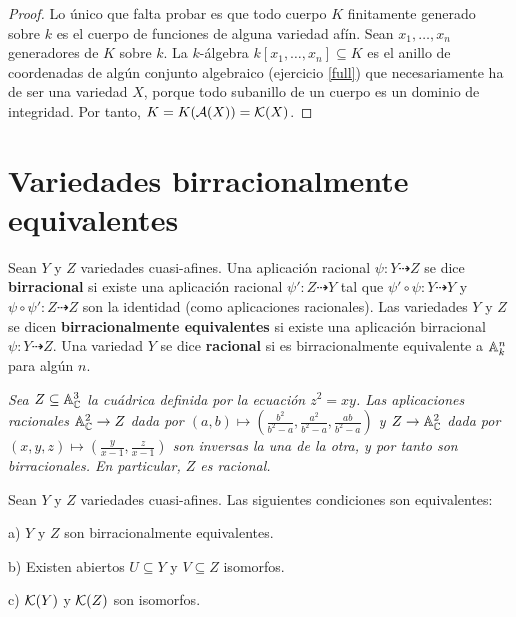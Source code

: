 \documentclass[ACGA.tex]{subfiles}
\begin{document}
\begin{proof}
 Lo único que falta probar es que todo cuerpo $K$ finitamente generado sobre $k$ es el cuerpo de funciones de alguna variedad afín. Sean $x_1,\ldots,x_n$ generadores de $K$ sobre $k$. La $k$-álgebra $k[x_1,\ldots,x_n]\subseteq K$ es el anillo de coordenadas de algún conjunto algebraico (ejercicio \ref{full}) que necesariamente ha de ser una variedad $X$, porque todo subanillo de un cuerpo es un dominio de integridad. Por tanto, $K=K(\mathcal{A}(X))={\mathcal K}(X)$.
\end{proof}


\section{Variedades birracionalmente equivalentes}


\begin{defi}
 Sean $Y$ y $Z$ variedades cuasi-afines. Una aplicación racional $\psi:Y\dashrightarrow Z$ se dice {\bf birracional} si existe una aplicación racional $\psi':Z\dashrightarrow Y$ tal que $\psi'\circ\psi:Y\dashrightarrow Y$ y $\psi\circ\psi':Z\dashrightarrow Z$ son la identidad (como aplicaciones racionales). Las variedades $Y$ y $Z$ se dicen {\bf birracionalmente equivalentes} si existe una aplicación birracional $\psi:Y\dashrightarrow Z$. Una variedad $Y$ se dice {\bf racional} si es birracionalmente equivalente a $\mathbb{A}^n_k$ para algún $n$.
\end{defi}

 \begin{ejs}\emph{
  Sea $Z\subseteq\mathbb{A}^3_{\mathbb{C}}$ la cuádrica definida por la ecuación $z^2=xy$. Las aplicaciones racionales $\mathbb{A}^2_{\mathbb{C}}\to Z$ dada por $(a,b)\mapsto(\frac{b^2}{b^2-a},\frac{a^2}{b^2-a},\frac{ab}{b^2-a})$ y $Z\to\mathbb{A}^2_{\mathbb{C}}$ dada por $(x,y,z)\mapsto (\frac{y}{x-1},\frac{z}{x-1})$ son inversas la una de la otra, y por tanto son birracionales. En particular, $Z$ es racional.}
 \end{ejs}

\begin{prop}\label{birracional}
 Sean $Y$ y $Z$ variedades cuasi-afines. Las siguientes condiciones son equivalentes:

a) $Y$ y $Z$ son birracionalmente equivalentes.

b) Existen abiertos $U\subseteq Y$ y $V\subseteq Z$ isomorfos.

c) ${\mathcal K}(Y)$ y ${\mathcal K}(Z)$ son isomorfos. 

\end{prop}
\end{document}
